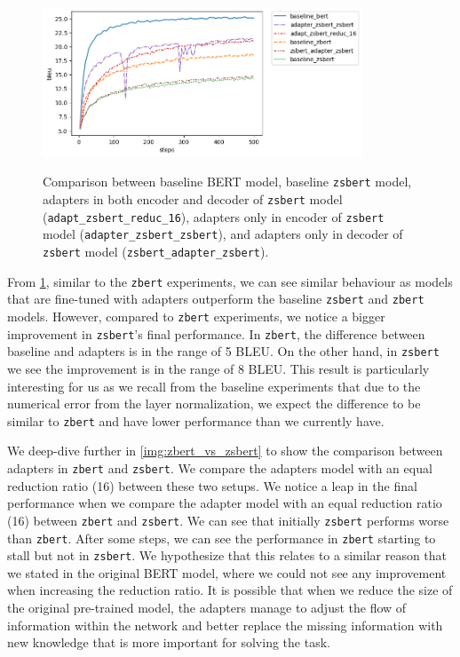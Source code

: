 \begin{figure}[h]
    {\includegraphics[width=0.85\textwidth]{img/zsbert_pos.png}}
    \centering
    \caption[Comparison between baseline BERT and \texttt{zsbert} models.]{Comparison between baseline BERT model, baseline \texttt{zsbert} model, adapters in both encoder and decoder of \texttt{zsbert} model (\texttt{adapt\_zsbert\_reduc\_16}), adapters only in encoder of \texttt{zsbert} model (\texttt{adapter\_zsbert\_zsbert}), and adapters only in decoder of \texttt{zsbert} model (\texttt{zsbert\_adapter\_zsbert}).}
    \label{img:zsbert_pos}
\end{figure}

From \cref{img:zsbert_pos}, similar to the \texttt{zbert} experiments, we can see similar behaviour as models that are fine-tuned with adapters outperform the baseline \texttt{zsbert} and \texttt{zbert} models. However, compared to \texttt{zbert} experiments, we notice a bigger improvement in \texttt{zsbert}'s final performance. In \texttt{zbert}, the difference between baseline and adapters is in the range of 5 BLEU. On the other hand, in \texttt{zsbert} we see the improvement is in the range of 8 BLEU. This result is particularly interesting for us as we recall from the baseline experiments that due to the numerical error from the layer normalization, we expect the difference to be similar to \texttt{zbert} and have lower performance than we currently have.

We deep-dive further in \cref{img:zbert_vs_zsbert} to show the comparison between adapters in \texttt{zbert} and \texttt{zsbert}. We compare the adapters model with an equal reduction ratio (16) between these two setups. We notice a leap in the final performance when we compare the adapter model with an equal reduction ratio (16) between \texttt{zbert} and \texttt{zsbert}. We can see that initially \texttt{zsbert} performs worse than \texttt{zbert}. After some steps, we can see the performance in \texttt{zbert} starting to stall but not in \texttt{zsbert}. We hypothesize that this relates to a similar reason that we stated in the original BERT model, where we could not see any improvement when increasing the reduction ratio. It is possible that when we reduce the size of the original pre-trained model, the adapters manage to adjust the flow of information within the network and better replace the missing information with new knowledge that is more important for solving the task.

